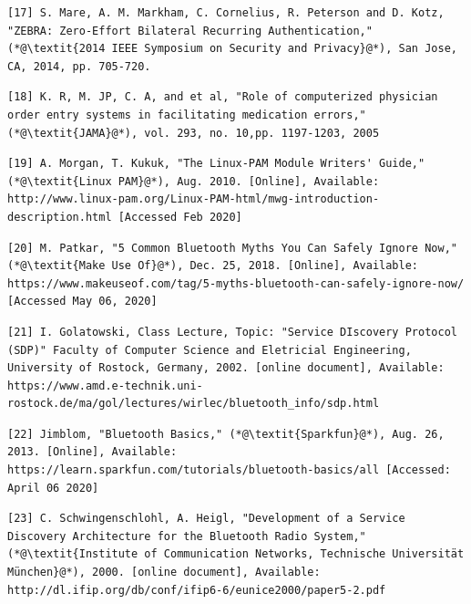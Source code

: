 \documentclass[letterpaper,twocolumn,10pt]{article}
\begin{document}
{{{\small
\begin{lstlisting}
[17] S. Mare, A. M. Markham, C. Cornelius, R. Peterson and D. Kotz, "ZEBRA: Zero-Effort Bilateral Recurring Authentication," (*@\textit{2014 IEEE Symposium on Security and Privacy}@*), San Jose, CA, 2014, pp. 705-720.
\end{lstlisting}
}

{\small
\begin{lstlisting}
[18] K. R, M. JP, C. A, and et al, "Role of computerized physician order entry systems in facilitating medication errors," (*@\textit{JAMA}@*), vol. 293, no. 10,pp. 1197-1203, 2005
\end{lstlisting}
}

{\small
\begin{lstlisting}
[19] A. Morgan, T. Kukuk, "The Linux-PAM Module Writers' Guide," (*@\textit{Linux PAM}@*), Aug. 2010. [Online], Available: http://www.linux-pam.org/Linux-PAM-html/mwg-introduction-description.html [Accessed Feb 2020]
\end{lstlisting}
}

{\small
\begin{lstlisting}
[20] M. Patkar, "5 Common Bluetooth Myths You Can Safely Ignore Now," (*@\textit{Make Use Of}@*), Dec. 25, 2018. [Online], Available: https://www.makeuseof.com/tag/5-myths-bluetooth-can-safely-ignore-now/ [Accessed May 06, 2020]
\end{lstlisting}
}

{\small
\begin{lstlisting}
[21] I. Golatowski, Class Lecture, Topic: "Service DIscovery Protocol (SDP)" Faculty of Computer Science and Eletricial Engineering, University of Rostock, Germany, 2002. [online document], Available: https://www.amd.e-technik.uni-rostock.de/ma/gol/lectures/wirlec/bluetooth_info/sdp.html
\end{lstlisting}
}

{\small
\begin{lstlisting}
[22] Jimblom, "Bluetooth Basics," (*@\textit{Sparkfun}@*), Aug. 26, 2013. [Online], Available: https://learn.sparkfun.com/tutorials/bluetooth-basics/all [Accessed: April 06 2020]
\end{lstlisting}
}

{\small
\begin{lstlisting}
[23] C. Schwingenschlohl, A. Heigl, "Development of a Service Discovery Architecture for the Bluetooth Radio System," (*@\textit{Institute of Communication Networks, Technische Universität München}@*), 2000. [online document], Available: http://dl.ifip.org/db/conf/ifip6-6/eunice2000/paper5-2.pdf
\end{lstlisting}
}

}}
\end{document}
